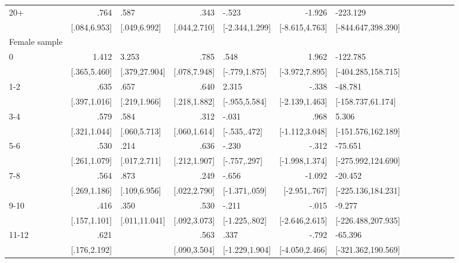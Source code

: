 \begin{table}[h]
\begin{adjustbox}{max width=\linewidth}
\begin{threeparttable}
{\begin{tabular}{l*{6}{D{.}{.}{-1}l}}
20+             &            .764&            .587&            .343&           -.523&          -1.926&        -223.129\\
                &    [.084,6.953]&    [.049,6.992]&    [.044,2.710]&  [-2.344,1.299]&  [-8.615,4.763]&[-844.647,398.390]\\
\midrule
Female sample &&&&&&\\
0               &           1.412&           3.253&            .785&            .548&           1.962&        -122.785\\
                &    [.365,5.460]&   [.379,27.904]&    [.078,7.948]&   [-.779,1.875]&  [-3.972,7.895]&[-404.285,158.715]\\

1-2             &            .635&            .657&            .640&           2.315&           -.338&         -48.781\\
                &    [.397,1.016]&    [.219,1.966]&    [.218,1.882]&   [-.955,5.584]&  [-2.139,1.463]&[-158.737,61.174]\\

3-4             &            .579&            .584&            .312&           -.031&            .968&           5.306\\
                &    [.321,1.044]&    [.060,5.713]&    [.060,1.614]&    [-.535,.472]&  [-1.112,3.048]&[-151.576,162.189]\\

5-6             &            .530&            .214&            .636&           -.230&           -.312&         -75.651\\
                &    [.261,1.079]&    [.017,2.711]&    [.212,1.907]&    [-.757,.297]&  [-1.998,1.374]&[-275.992,124.690]\\

7-8             &            .564&            .873&            .249&           -.656&          -1.092&         -20.452\\
                &    [.269,1.186]&    [.109,6.956]&    [.022,2.790]&   [-1.371,.059]&   [-2.951,.767]&[-225.136,184.231]\\

9-10            &            .416&            .350&            .530&           -.211&           -.015&          -9.277\\
                &    [.157,1.101]&   [.011,11.041]&    [.092,3.073]&   [-1.225,.802]&  [-2.646,2.615]&[-226.488,207.935]\\

11-12           &            .621&                &            .563&            .337&           -.792&         -65.396\\
                &    [.176,2.192]&                &    [.090,3.504]&  [-1.229,1.904]&  [-4.050,2.466]&[-321.362,190.569]\\


\end{tabular}}
\end{threeparttable}
\end{adjustbox}
\end{table}
